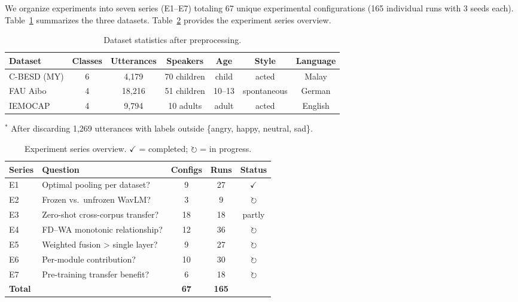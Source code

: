 \documentclass[11pt,a4paper]{article}
\begin{document}
We organize experiments into seven series (E1--E7) totaling 67 unique
experimental configurations (165 individual runs with 3 seeds each).
Table~\ref{tab:datasets} summarizes the three datasets.
Table~\ref{tab:exp_overview} provides the experiment series overview.

\begin{table}[t]
\centering
\caption{Dataset statistics after preprocessing.}
\label{tab:datasets}
\begin{tabular}{lcccccc}
\toprule
\textbf{Dataset} & \textbf{Classes} & \textbf{Utterances} & \textbf{Speakers} & \textbf{Age} & \textbf{Style} & \textbf{Language} \\
\midrule
C-BESD (MY) & 6 & 4,179 & 70 children & child & acted & Malay \\
FAU Aibo    & 4 & 18,216 & 51 children & 10--13 & spontaneous & German \\
IEMOCAP     & 4 & 9,794 & 10 adults & adult & acted & English \\
\bottomrule
\end{tabular}
\vspace{4pt}
\footnotesize{$^*$ After discarding 1,269 utterances with labels outside \{angry, happy, neutral, sad\}.}
\end{table}

\begin{table}[t]
\centering
\caption{Experiment series overview. $\checkmark$ = completed; $\circlearrowright$ = in progress.}
\label{tab:exp_overview}
\begin{tabular}{llccc}
\toprule
\textbf{Series} & \textbf{Question} & \textbf{Configs} & \textbf{Runs} & \textbf{Status} \\
\midrule
E1 & Optimal pooling per dataset? & 9 & 27 & $\checkmark$ \\
E2 & Frozen vs.\ unfrozen WavLM? & 3 & 9 & $\circlearrowright$ \\
E3 & Zero-shot cross-corpus transfer? & 18 & 18 & partly \\
E4 & FD--WA monotonic relationship? & 12 & 36 & $\circlearrowright$ \\
E5 & Weighted fusion > single layer? & 9 & 27 & $\circlearrowright$ \\
E6 & Per-module contribution? & 10 & 30 & $\circlearrowright$ \\
E7 & Pre-training transfer benefit? & 6 & 18 & $\circlearrowright$ \\
\midrule
\textbf{Total} & & \textbf{67} & \textbf{165} & \\
\bottomrule
\end{tabular}
\end{table}
\end{document}
